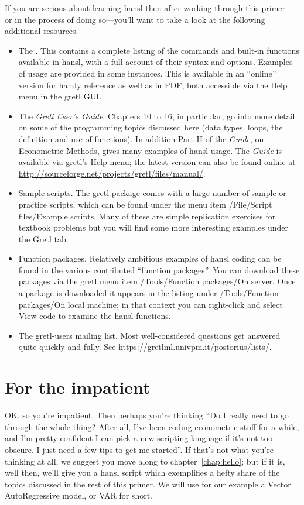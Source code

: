 \documentclass[oneside]{book}
\begin{document}
If you are serious about learning hansl then after working through
this primer---or in the process of doing so---you'll want to take a
look at the following additional resources.
\begin{itemize}
\item The \GCR. This contains a complete listing of the commands and
  built-in functions available in hansl, with a full account of their
  syntax and options. Examples of usage are provided in some
  instances. This is available in an ``online'' version for handy
  reference as well as in PDF, both accessible via the \textsf{Help} menu
  in the gretl GUI.
\item The \textit{Gretl User's Guide}. Chapters 10 to 16, in
  particular, go into more detail on some of the programming topics
  discussed here (data types, loops, the definition and use of
  functions). In addition Part II of the \textit{Guide}, on
  Econometric Methods, gives many examples of hansl usage. The
  \textit{Guide} is available via gretl's \textsf{Help} menu; the
  latest version can also be found online at
  \url{http://sourceforge.net/projects/gretl/files/manual/}.
\item Sample scripts. The gretl package comes with a large number of
  sample or practice scripts, which can be found under the menu item
  \textsf{/File/Script files/Example scripts}. Many of these are simple
  replication exercises for textbook problems but you will find some
  more interesting examples under the \textsf{Gretl} tab.
\item Function packages. Relatively ambitious examples of hansl coding
  can be found in the various contributed ``function packages''. You
  can download these packages via the gretl menu item
  \textsf{/Tools/Function packages/On server}. Once a package is
  downloaded it appears in the listing under \textsf{/Tools/Function
    packages/On local machine}; in that context you can right-click
  and select \textsf{View code} to examine the hansl functions.
\item The gretl-users mailing list. Most well-considered
  questions get answered quite quickly and fully. See
  \url{https://gretlml.univpm.it/postorius/lists/}.
\end{itemize}

\chapter{For the impatient}
\label{chap:impatient}

OK, so you're impatient. Then perhaps you're thinking ``Do I really
need to go through the whole thing? After all, I've been coding
econometric stuff for a while, and I'm pretty confident I can pick a
new scripting language if it's not too obscure.  I just need a few
tips to get me started''. If that's not what you're thinking at all,
we suggest you move along to chapter~\ref{chap:hello}; but if it is,
well then, we'll give you a hansl script which exemplifies a hefty
share of the topics discussed in the rest of this primer. We will use
for our example a Vector AutoRegressive model, or VAR for short.
\end{document}
